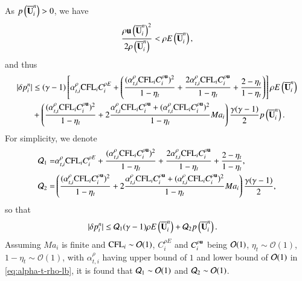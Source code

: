 As $p\left(\overline{\mathbf{U}}^n_i\right) > 0$, we have
\begin{equation}
    \frac{ \rho\mathbf{u}\left(\overline{\mathbf{U}}^n_i\right)^2}{2\rho\left(\overline{\mathbf{U}}^n_i\right)} < \rho E\left(\overline{\mathbf{U}}^n_i\right),
\end{equation}
and thus
\begin{equation}
    \begin{aligned}
        |\delta p_i^n| &\leq
        (\gamma-1)\left[
         \alpha_{t,i}^\rho\text{CFL}_i C^{\rho E}_i  
        +\left(
        \frac{(\alpha_{t,i}^\rho\text{CFL}_i C^{\rho \mathbf{u}}_i)^2}{1-\eta_t}
        +\frac{2\alpha_{t,i}^\rho\text{CFL}_i C^{\rho \mathbf{u}}_i}{1-\eta_t}
        + \frac{2-\eta_t}{1-\eta_t}
        \right)
        \right]
        \rho E\left( \overline{\mathbf{U}}^n_i \right)
        \\  & +
        \left(
        \frac{(\alpha_{t,i}^\rho\text{CFL}_i C^{\rho \mathbf{u}}_i)^2}
        {1-\eta_t}
        +
        2 
        \frac{\alpha_{t,i}^\rho\text{CFL}_i C^{\rho \mathbf{u}}_i + (\alpha_{t,i}^\rho\text{CFL}_i C^{\rho \mathbf{u}}_i)^2
       }
       {1-\eta_t}Ma_i
        \right)
        \frac{\gamma(\gamma-1) }{2} p\left(\overline{\mathbf{U}}^n_i\right).
    \end{aligned}
\end{equation}
For simplicity, we denote
\begin{equation}
\begin{aligned}
    \mathcal{Q}_1 = & \alpha_{t,i}^\rho\text{CFL}_i C^{\rho E}_i  
        +
        \frac{(\alpha_{t,i}^\rho\text{CFL}_i C^{\rho \mathbf{u}}_i)^2}{1-\eta_t}
        +\frac{2\alpha_{t,i}^\rho\text{CFL}_i C^{\rho \mathbf{u}}_i}{1-\eta_t}
        + \frac{2-\eta_t}{1-\eta_t},
        \\
    \mathcal{Q}_2 = & 
    \left(\frac{(\alpha_{t,i}^\rho\text{CFL}_i C^{\rho \mathbf{u}}_i)^2}
        {1-\eta_t}
        +
        2 
        \frac{\alpha_{t,i}^\rho\text{CFL}_i C^{\rho \mathbf{u}}_i + (\alpha_{t,i}^\rho\text{CFL}_i C^{\rho \mathbf{u}}_i)^2
       }
       {1-\eta_t}Ma_i 
       \right)\frac{\gamma(\gamma-1) }{2},\\
\end{aligned}
\end{equation}
so that
\begin{equation}
    \begin{aligned}
        |\delta p_i^n| &\leq
        \mathcal{Q}_1 (\gamma-1)
        \rho E\left( \overline{\mathbf{U}}^n_i \right)
        +
        \mathcal{Q}_2  p\left(\overline{\mathbf{U}}^n_i\right).
    \end{aligned}
\end{equation}
Assuming $Ma_i$ is finite and $\text{CFL}_i\sim \mathcal{O}(1)$, 
$C^{\rho E}_i$ and $C^{\rho\mathbf{u}}_i$ being $\mathcal{O}(1)$, 
$\eta_t\sim\mathcal{O}(1)$,
$1-\eta_t\sim\mathcal{O}(1)$,
with $\alpha_{t,i}^\rho$ having upper bound of $1$ and lower bound of $\mathcal{O}(1)$ in \eqref{eq:alpha-t-rho-lb}, it is found that $\mathcal{Q}_1\sim\mathcal{O}(1)$ and $\mathcal{Q}_2\sim\mathcal{O}(1)$.


